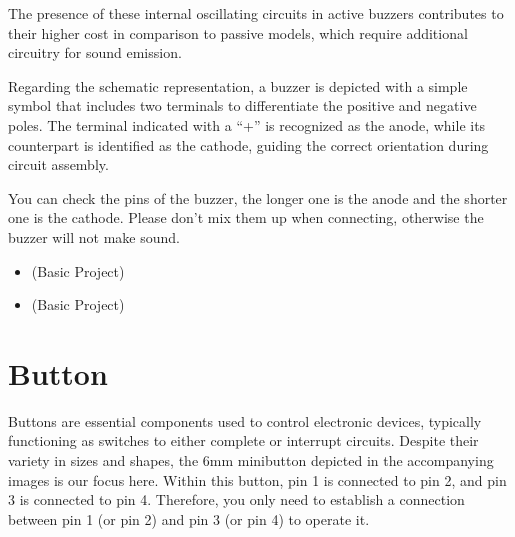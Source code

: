 \documentclass[a4paper,11pt,english]{sphinxmanual}
\let\sphinxpxdimen\pdfpxdimen\else\newdimen\sphinxpxdimen
\begin{document}
\sphinxAtStartPar
The presence of these internal oscillating circuits in active buzzers contributes to their higher cost in comparison to passive models, which require additional circuitry for sound emission.

\sphinxAtStartPar
Regarding the schematic representation, a buzzer is depicted with a simple symbol that includes two terminals to differentiate the positive and negative poles. The terminal indicated with a “+” is recognized as the anode, while its counterpart is identified as the cathode, guiding the correct orientation during circuit assembly.

\noindent\sphinxincludegraphics[width=150\sphinxpxdimen]{{buzzer_symbol}.png}

\sphinxAtStartPar
You can check the pins of the buzzer, the longer one is the anode and the shorter one is the cathode. Please don’t mix them up when connecting, otherwise the buzzer will not make sound.

\sphinxAtStartPar
{}

\sphinxAtStartPar
{}
\begin{itemize}
\item {} 
\sphinxAtStartPar
{\hyperref[\detokenize{Basic_Project/Active_Buzzer:basic-active-buzzer}]{}} (Basic Project)

\item {} 
\sphinxAtStartPar
{\hyperref[\detokenize{Basic_Project/Passive_Buzzer:basic-passive-buzzer}]{}} (Basic Project)

\end{itemize}

\sphinxstepscope


\section{Button}
\label{\detokenize{Components_Kit/component_button:button}}\label{\detokenize{Components_Kit/component_button:cpn-button}}\label{\detokenize{Components_Kit/component_button::doc}}
\noindent{\hspace*{\fill}\sphinxincludegraphics[width=400\sphinxpxdimen]{{button}.png}\hspace*{\fill}}

\sphinxAtStartPar
Buttons are essential components used to control electronic devices, typically functioning as switches to either complete or interrupt circuits. Despite their variety in sizes and shapes, the 6mm mini\sphinxhyphen{}button depicted in the accompanying images is our focus here. Within this button, pin 1 is connected to pin 2, and pin 3 is connected to pin 4. Therefore, you only need to establish a connection between pin 1 (or pin 2) and pin 3 (or pin 4) to operate it.
\end{document}
